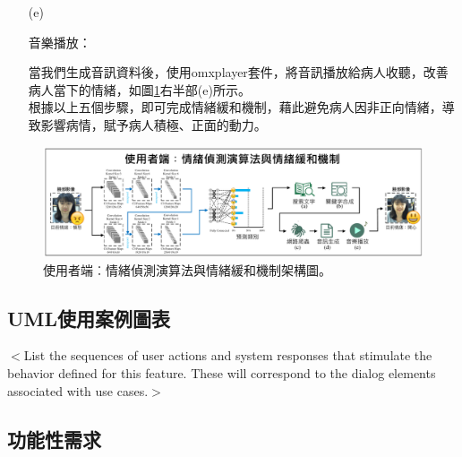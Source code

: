 \documentclass[12pt]{scrreprt}
\begin{document}
\begin{itemize}
\begin{itemize}
\item[(e)]{\begin{bfseries}{音樂播放：}\end{bfseries}}

當我們生成音訊資料後，使用omxplayer套件，將音訊播放給病人收聽，改善病人當下的情緒，如圖\ref{fig:FrameworkFirstAndSecond}右半部(e)所示。\\

根據以上五個步驟，即可完成情緒緩和機制，藉此避免病人因非正向情緒，導致影響病情，賦予病人積極、正面的動力。\\

\end{itemize}
\end{itemize}

\begin{figure}[!h]
\begin{center}
\includegraphics[width=1\textwidth]{./figs/FrameworkFirstAndSecond.pdf}
\end{center}
\caption{使用者端︰情緒偵測演算法與情緒緩和機制架構圖。}
\label{fig:FrameworkFirstAndSecond}
\end{figure}

\subsection{UML使用案例圖表}
$<$List the sequences of user actions and system responses that stimulate the 
behavior defined for this feature. These will correspond to the dialog elements 
associated with use cases.$>$

\subsection{功能性需求}
\end{document}
